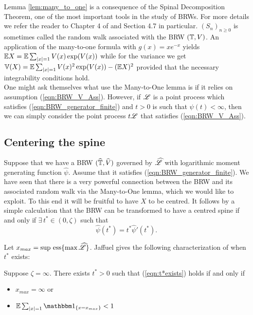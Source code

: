 Lemma \ref{lem:many_to_one} is a consequence of the Spinal Decomposition Theorem, one of the most important tools in the study of BRWs. For more details we refer the reader to Chapter 4 of \cite{shi2015branching} and Section 4.7 in particular. $(S_n)_{n\geq0}$ is sometimes called the random walk associated with the BRW $(\mathbb{T}, V)$. An application of the many-to-one formula with $g(x) = x e^{-x}$ yields $\mathbb{E} X = \mathbb{E} \sum_{|x|=1} V(x) \exp(V(x))$ while for the variance we get $\mathbb{V}(X) = \mathbb{E} \sum_{|x|=1} V(x)^2 \exp(V(x)) - (\mathbb{E} X)^2$ provided that the necessary integrability conditions hold. \\

One might ask themselves what use the Many-to-One lemma is if it relies on assumption (\ref{eqn:BRW_V_Ass}). However, if $\mathscr{L}$ is a point process which satisfies (\ref{eqn:BRW_generator_finite}) and $t > 0$ is such that $\psi(t) < \infty$, then we can simply consider the point process $t \mathscr{L}$ that satisfies (\ref{eqn:BRW_V_Ass}). 





\subsection{Centering the spine}
Suppose that we have a BRW $(\widehat{\mathbb{T}}, \widehat{V})$ governed by $\widehat{\mathscr{L}}$ with logarithmic moment generating function $\widehat{\psi}$. Assume that it satisfies (\ref{eqn:BRW_generator_finite}). We have seen that there is a very powerful connection between the BRW and its associated random walk via the Many-to-One lemma, which we would like to exploit. To this end it will be fruitful to have $X$ to be centred. It follows by a simple calculation that the BRW can be transformed to have a centred spine if and only if $\exists\, t^* \in (0, \zeta)$ such that
\begin{equation}\label{eqn:t*exists}
\widehat{\psi} (t^*) = t^* \widehat{\psi}'(t^*). 
\end{equation}

Let $x_{max} = \operatorname*{sup~ess} \{\max\widehat{\mathscr{L}}\}$. Jaffuel gives the following characterization of when $t^*$ exists:
\begin{proposition}\label{prop:jaffuel}
Suppose $\zeta = \infty$. There exists $t^* > 0$ such that (\ref{eqn:t*exists}) holds if and only if 
\begin{itemize}
\item \vspace{-2mm} $x_{max} = \infty$ or
\item \vspace{-2mm} $\E \sum_{|x|=1} \Ind_{\{ x = x_{max}\}} < 1$
\end{itemize}	
\end{proposition}

